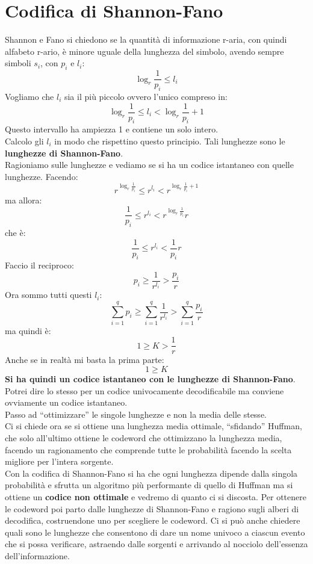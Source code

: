 \documentclass[a4paper,12pt, oneside]{book}
\begin{document}
\section{Codifica di Shannon-Fano}
Shannon e Fano si chiedono se la quantità di informazione r-aria, con quindi
alfabeto r-ario, è minore uguale
della lunghezza del simbolo, avendo sempre simboli $s_i$, con $p_i$ e $l_i$:
\[\log_r\frac{1}{p_i}\leq l_i\]
Vogliamo che $l_i$ sia il più piccolo ovvero l'unico compreso in:
\[\log_r \frac{1}{p_i}\leq l_i< \log_r\frac{1}{p_i}+1\]
Questo intervallo ha ampiezza 1 e contiene un solo intero.\\
Calcolo gli $l_i$ in modo che rispettino questo principio. Tali lunghezze sono
le \textbf{lunghezze di Shannon-Fano}.\\
Ragioniamo sulle lunghezze e vediamo se si ha un codice istantaneo con quelle
lunghezze. 
Facendo:
\[r^{\log_r \frac{1}{p_i}}\leq r^{ l_i}< r^{\log_r\frac{1}{p_i}+1}\]
ma allora:
\[ \frac{1}{p_i}\leq r^{l_i}< r^{\log_r\frac{1}{p_i}}r\]
che è:
\[ \frac{1}{p_i}\leq r^{l_i}< \frac{1}{p_i}r\]
Faccio il reciproco:
\[p_i\geq \frac{1}{r^{l_i}}> \frac{p_i}{r}\]
Ora sommo tutti questi $l_i$:
\[\sum_{i=1}^qp_i\geq \sum_{i=1}^q\frac{1}{r^{l_i}}>\sum_{i=1}^q \frac{p_i}{r}\]
ma quindi è:
\[1\geq K> \frac{1}{r}\]
Anche se in realtà mi basta la prima parte:
\[1\geq K\]
\textbf{Si ha quindi un codice istantaneo con le lunghezze di
  Shannon-Fano}. Potrei dire lo stesso per un codice univocamente decodificabile
ma conviene ovviamente un codice istantaneo.\\
Passo ad ``ottimizzare'' le singole lunghezze e non la media delle stesse.\\
Ci si chiede ora se si ottiene una lunghezza media ottimale, ``sfidando''
Huffman, che solo all'ultimo ottiene le codeword che ottimizzano la lunghezza
media, facendo un ragionamento che comprende tutte le probabilità facendo la
scelta migliore per l'intera sorgente.  \\
Con la codifica di Shannon-Fano si ha che ogni lunghezza dipende dalla singola
probabilità e sfrutta un algoritmo più performante di quello di Huffman ma si
ottiene un \textbf{codice non ottimale} e vedremo di quanto ci si discosta. Per
ottenere le codeword poi parto dalle lunghezze di Shannon-Fano e ragiono sugli
alberi di decodifica, costruendone uno per scegliere le codeword. Ci si può
anche chiedere quali sono le lunghezze che consentono di dare un nome univoco a
ciascun evento che si possa verificare, astraendo dalle sorgenti e arrivando al
nocciolo dell'essenza dell'informazione. \\
\end{document}
